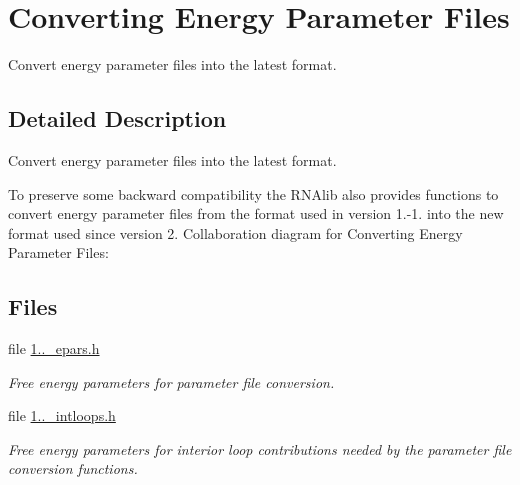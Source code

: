 \hypertarget{group__energy__parameters__convert}{}\section{Converting Energy Parameter Files}
\label{group__energy__parameters__convert}


Convert energy parameter files into the latest format.  




\subsection{Detailed Description}
Convert energy parameter files into the latest format. 

To preserve some backward compatibility the R\+N\+Alib also provides functions to convert energy parameter files from the format used in version 1.-\/1. into the new format used since version 2. Collaboration diagram for Converting Energy Parameter Files\+:
\subsection*{Files}
\begin{DoxyCompactItemize}
\item 
file \mbox{\hyperlink{1_88_84__epars_8h}{1..\+\_\+epars.\+h}}
\begin{DoxyCompactList}\small\item\em Free energy parameters for parameter file conversion. \end{DoxyCompactList}\item 
file \mbox{\hyperlink{1_88_84__intloops_8h}{1..\+\_\+intloops.\+h}}
\begin{DoxyCompactList}\small\item\em Free energy parameters for interior loop contributions needed by the parameter file conversion functions. \end{DoxyCompactList}\end{DoxyCompactItemize}
